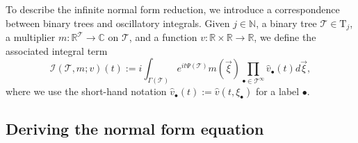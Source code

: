 \documentclass[%
11pt,  reqno]{amsart}
\makeatletter
\newcommand{\5}{\textup{V}}
\newcommand{\noi}{\noindent}
\newcommand{\ft}{\widehat}
\newtheorem{example}{Example}
\theoremstyle{remark}
\newcommand{\R}{\mathbb{R}}
\newcommand{\bbC}{\mathbb{C}}
\newcommand{\bul}{\bullet}
\newcommand{\TT}{\mathcal{T}}
\newcommand{\Tr}{\mathrm{T}}
\newcommand{\G}{\Gamma}
\newcommand{\N}{\mathbb{N}}
\def\<#1>{\csname MH@symb@#1\endcsname}
\def\distC{15}
\newcommand{\cherry}[3]{
	\begin{tikzpicture}[
		baseline=-8, scale=0.6, every node/.style={dotA},
		level distance=15pt,
		level 1/.style={sibling distance=\distC pt}
		]
		\node  [label=above:{$#1$}]  (root) {}
		child
		child
		;
		\node [label= left:{$#2$}]  at (root-1) {};
		\node [label= right:{$#3$}] at (root-2) {};
	\end{tikzpicture}
}
\newcommand{\Ical}{\mathcal{I}}
\numberwithin{equation}{section}
\numberwithin{theorem}{section}
\makeatother
\begin{document}
To describe the infinite normal form reduction, we introduce a correspondence between binary trees and oscillatory integrals. 
Given $j\in\N$, a binary tree $\TT \in \Tr_j$, a multiplier $m:\R^{\TT}\to \bbC$ on $\TT$, and a
function $v: \R\times \R \to\R$, we define the associated integral term
\begin{equation}\label{eq:defiI}
\Ical(\TT, m; v)(t) :=   i \int_{\G(\TT)}
e^{it\Psi(\TT)}m(\vec{\xi})
\prod_{\bul\in \TT^\infty}  \ft v_\bul (t) d\vec{\xi},
\end{equation}
where 
we use the short-hand notation  $\ft v_\bul(t) := \ft v(t,\xi_\bul)$ for a label $\bul$. 




%
%
%
%




\subsection{Deriving the normal form equation}\label{sec:nfe}
\end{document}
